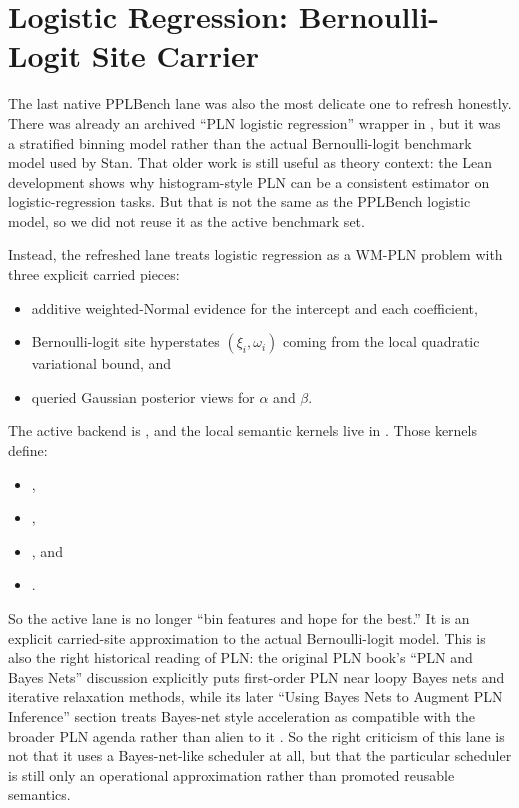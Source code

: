 \documentclass[11pt,openany]{report}
\begin{document}
\section{Logistic Regression: Bernoulli-Logit Site Carrier}
\label{app:pplbench-logistic-regression}

The last native PPLBench lane was also the most delicate one to refresh
honestly.  There was already an archived ``PLN logistic regression'' wrapper in
, but it was a
stratified binning model rather than the actual Bernoulli-logit benchmark model
used by Stan.  That older work is still useful as theory context: the Lean
 development shows why histogram-style PLN can be a
consistent estimator on logistic-regression tasks.  But that is not the same as
the PPLBench logistic model, so we did not reuse it as the active benchmark
set.

Instead, the refreshed lane treats logistic regression as a WM-PLN problem with
three explicit carried pieces:
\begin{itemize}
\item additive weighted-Normal evidence for the intercept and each coefficient,
\item Bernoulli-logit site hyperstates \((\xi_i, \omega_i)\) coming from the
local quadratic variational bound, and
\item queried Gaussian posterior views for \(\alpha\) and \(\beta\).
\end{itemize}
The active backend is
, and the local semantic
kernels live in
.
Those kernels define:
\begin{itemize}
\item {},
\item {},
\item {}, and
\item {}.
\end{itemize}
So the active lane is no longer ``bin features and hope for the best.''  It is
an explicit carried-site approximation to the actual Bernoulli-logit model.
This is also the right historical reading of PLN: the original PLN book's
``PLN and Bayes Nets'' discussion explicitly puts first-order PLN near loopy
Bayes nets and iterative relaxation methods, while its later ``Using Bayes
Nets to Augment PLN Inference'' section treats Bayes-net style acceleration as
compatible with the broader PLN agenda rather than alien to it
\cite[Sec.~1.6.3]{goertzel2009pln}\cite[Sec.~9.4]{goertzel2009pln}.  So the
right criticism of this lane is not that it uses a Bayes-net-like scheduler at
all, but that the particular scheduler is still only an operational
approximation rather than promoted reusable semantics.
\end{document}
